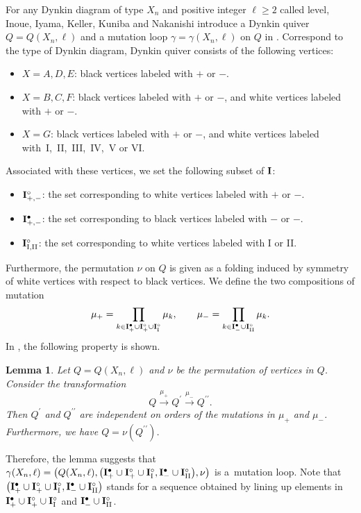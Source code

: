 \documentclass[10pt,a4paper]{amsart}
\numberwithin{equation}{section}
\newtheorem{Lemma}[Theorem]{Lemma}
\begin{document}
For any Dynkin diagram of type $X_n$ and positive integer $\ell\geq2$ called level, Inoue, Iyama, Keller, Kuniba and Nakanishi introduce a Dynkin quiver $Q=Q(X_n,\ell)$ and a mutation loop $\gamma=\gamma(X_n,\ell)$ on $Q$ in \cite{IIKKN, IIKKN2}.
Correspond to the type of Dynkin diagram, Dynkin quiver consists of the following vertices:
	\begin{itemize}\itemsep=0pt
	\item $X=A,D,E$: black vertices labeled with $+$ or $-$.
	\item $X=B,C,F$: black vertices labeled with $+$ or $-$, and white vertices labeled with $+$ or $-$.
	\item $X=G$: black vertices labeled with $+$ or $-$, and white vertices labeled with~I,~II,~III,~IV,~V or VI.
	\end{itemize}
Associated with these vertices, we set the following subset of ${\bf I}$:
	\begin{itemize}\itemsep=0pt
	\item ${\bf I}_{+,-}^\circ$: the set corresponding to white vertices labeled with $+$ or $-$.
	\item ${\bf I}_{+,-}^\bullet$: the set corresponding to black vertices labeled with $-$ or $-$.
	\item ${\bf I}_{\rm I,II}^\circ$: the set corresponding to white vertices labeled with I or II.
	\end{itemize}
Furthermore, the permutation $\nu$ on $Q$ is given as a folding induced by symmetry of white vertices with respect to black vertices.
We define the two compositions of mutation
		\[\mu_+=\prod_{k\in{\bf I}_+^{\bullet}\cup{\bf I}_+^{\circ}\cup{\bf I}_{\rm I}^\circ}\mu_k,\qquad \mu_-=\prod_{k\in{\bf I}_-^{\bullet}\cup{\bf I}_{\rm II}^\circ}\mu_k.\]
In \cite{IIKKN,IIKKN2}, the following property is shown.
		\begin{Lemma}
		Let $Q=Q(X_n,\ell)$ and $\nu$ be the permutation of vertices in $Q$.
		Consider the transformation
			\[Q\overset{\mu_+}{\longrightarrow}Q^\prime\overset{\mu_-}{\longrightarrow}Q^{\prime\prime}.\]
		Then $Q^\prime$ and $Q^{\prime\prime}$ are independent on orders of the mutations in $\mu_+$ and $\mu_-$.
		Furthermore, we have $Q=\nu(Q^{\prime\prime})$.
		\end{Lemma}
Therefore, the lemma suggests that $\gamma(X_n,\ell)=\bigl(Q(X_n,\ell),\bigl({\bf I}_+^{\bullet}\cup{\bf I}_+^{\circ}\cup{\bf I}_{\rm I}^\circ,{\bf I}_-^{\bullet}\cup{\bf I}_{\rm II}^\circ\bigr),\nu\bigr)$ is a~mutation loop.
Note that $\bigl({\bf I}_+^{\bullet}\cup{\bf I}_+^{\circ}\cup{\bf I}_{\rm I}^\circ,{\bf I}_-^{\bullet}\cup{\bf I}_{\rm II}^\circ\bigr)$ stands for a sequence obtained by lining up elements in ${\bf I}_+^\bullet\cup{\bf I}_+^\circ\cup{\bf I}_{\rm I}^\circ$ and ${\bf I}_-^\bullet\cup{\bf I}_{\rm II}^\circ$.
\end{document}
